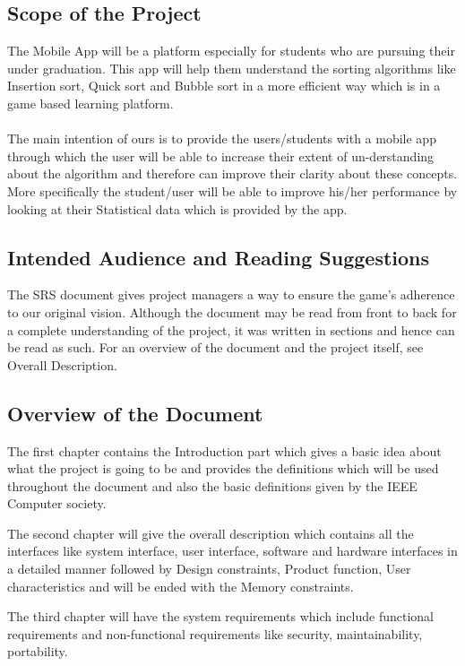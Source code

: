 \documentclass[a4paper,11pt]{article}
\begin{document}
\subsection{Scope of the Project}
	The Mobile App will be a platform especially for students who are pursuing their under graduation. This app will help them understand the sorting algorithms like Insertion sort, Quick sort and Bubble sort in a more efficient way which is in a game based learning platform. \\ \\The main intention of ours is to provide the users/students with a mobile app through which the user will be able to increase their extent of un-derstanding about the algorithm and therefore can improve their clarity about these concepts. More specifically the student/user will be able to improve his/her performance by looking at their Statistical data which is provided by the app.

\subsection{Intended Audience and Reading Suggestions}
	The SRS document gives project managers a way to ensure the game’s adherence to our original vision. Although the document may be read from front to back for a complete understanding of the project, it was written in sections and hence can be read as such. For an overview of the document and the project itself, see Overall Description.

\subsection{Overview of the Document}
	The first chapter contains the Introduction part which gives a basic idea about what the project is going to be and provides the definitions which will be used throughout the document and also the basic definitions given by the IEEE Computer society. 

	The second chapter will give the overall description which contains all the interfaces like system interface, user interface, software and hardware interfaces in a detailed manner followed by Design constraints, Product function, User characteristics and will be ended with the Memory constraints.

	The third chapter will have the system requirements which include functional requirements and non-functional requirements like security, maintainability, portability.
\end{document}

